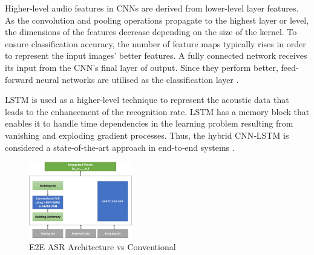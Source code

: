Higher-level audio features in CNNs are derived from lower-level layer features. As the convolution and pooling operations propagate to the highest layer or level, the dimensions of the features decrease depending on the size of the kernel. To ensure classification accuracy, the number of feature maps typically rises in order to represent the input images' better features. A fully connected network receives its input from the CNN's final layer of output. Since they perform better, feed-forward neural networks are utilised as the classification layer \cite{abdel-hamid_exploring_2013}.


LSTM is used as a higher‐level technique to represent the acoustic data that leads to the enhancement of the recognition rate. LSTM has a memory block that enables it to handle time dependencies in the learning problem resulting from vanishing and exploding gradient processes. Thus, the hybrid CNN‐LSTM is considered a state‐of‐the‐art approach in end‐to‐end systems \cite{alsayadi_arabic_2021}.


\begin{figure}[h]
    \centering
    \includegraphics[width=0.4\textwidth]{img/E2EvsConventional.png}
    \caption{E2E ASR Architecture vs Conventional}
    \label{fig:e2e-asr}
\end{figure}

